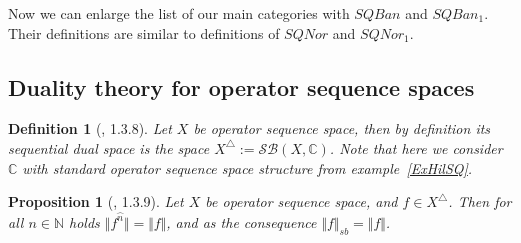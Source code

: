 \documentclass[12pt]{article}
\newtheorem{proposition}[theorem]{Proposition}
\newtheorem{definition}[theorem]{Definition}
\begin{document}
Now we can enlarge the list of our main categories with $SQBan$ and $SQBan_1$. 
Their definitions are similar to definitions of $SQNor$ and $SQNor_1$.










































\subsection{Duality theory for operator sequence spaces}

\begin{definition}[\cite{LamOpFolgen}, 1.3.8]\label{DeffSQDual} 
Let $X$ be operator sequence space, then by definition its sequential dual space 
is the space $X^\triangle := \mathcal{SB}(X, \mathbb{C})$. Note that here we 
consider $\mathbb{C}$ with standard operator sequence space structure from 
example~\ref{ExHilSQ}. 
\end{definition}

\begin{proposition}[\cite{LamOpFolgen}, 1.3.9]\label{PrEveryLinFuncIsSQBounded}
Let $X$ be operator sequence space, and $f\in X^\triangle$. Then for all 
$n\in\mathbb{N}$ holds $\Vert f^{\wideparen{n}}\Vert=\Vert f\Vert$, and as the 
consequence $\Vert f\Vert_{sb}=\Vert f\Vert$.
\end{proposition}
\end{document}
